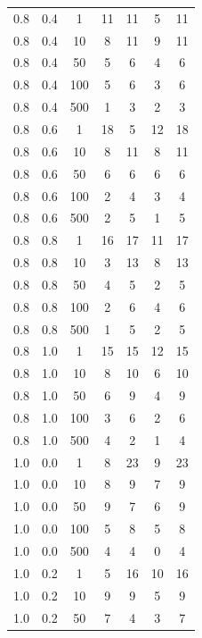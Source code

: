 \begin{longtable}{|c|c|c|c|c|c|c|}
	0.8 &  0.4 &    1 &    11 &    11 &     5 &    11 \\
	0.8 &  0.4 &   10 &     8 &    11 &     9 &    11 \\
	0.8 &  0.4 &   50 &     5 &     6 &     4 &     6 \\
	0.8 &  0.4 &  100 &     5 &     6 &     3 &     6 \\
	0.8 &  0.4 &  500 &     1 &     3 &     2 &     3 \\ \hline
	0.8 &  0.6 &    1 &    18 &     5 &    12 &    18 \\
	0.8 &  0.6 &   10 &     8 &    11 &     8 &    11 \\
	0.8 &  0.6 &   50 &     6 &     6 &     6 &     6 \\
	0.8 &  0.6 &  100 &     2 &     4 &     3 &     4 \\
	0.8 &  0.6 &  500 &     2 &     5 &     1 &     5 \\ \hline
	0.8 &  0.8 &    1 &    16 &    17 &    11 &    17 \\
	0.8 &  0.8 &   10 &     3 &    13 &     8 &    13 \\
	0.8 &  0.8 &   50 &     4 &     5 &     2 &     5 \\
	0.8 &  0.8 &  100 &     2 &     6 &     4 &     6 \\
	0.8 &  0.8 &  500 &     1 &     5 &     2 &     5 \\ \hline
	0.8 &  1.0 &    1 &    15 &    15 &    12 &    15 \\
	0.8 &  1.0 &   10 &     8 &    10 &     6 &    10 \\
	0.8 &  1.0 &   50 &     6 &     9 &     4 &     9 \\
	0.8 &  1.0 &  100 &     3 &     6 &     2 &     6 \\
	0.8 &  1.0 &  500 &     4 &     2 &     1 &     4 \\ \hline
	1.0 &  0.0 &    1 &     8 &    23 &     9 &    23 \\
	1.0 &  0.0 &   10 &     8 &     9 &     7 &     9 \\
	1.0 &  0.0 &   50 &     9 &     7 &     6 &     9 \\
	1.0 &  0.0 &  100 &     5 &     8 &     5 &     8 \\
	1.0 &  0.0 &  500 &     4 &     4 &     0 &     4 \\ \hline
	1.0 &  0.2 &    1 &     5 &    16 &    10 &    16 \\
	1.0 &  0.2 &   10 &     9 &     9 &     5 &     9 \\
	1.0 &  0.2 &   50 &     7 &     4 &     3 &     7 \\

\end{longtable}
